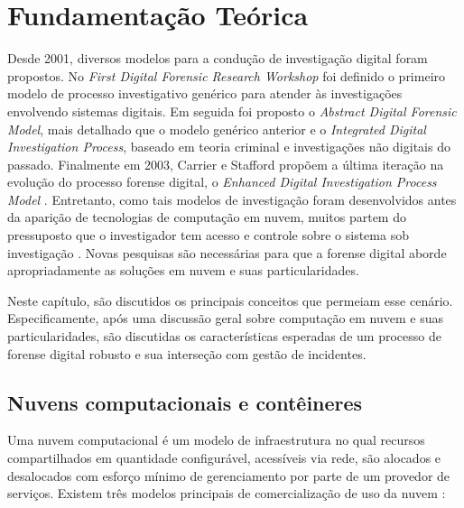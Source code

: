 \chapter{Fundamentação Teórica}
\label{chp:fundamentação}


Desde 2001, diversos modelos para a condução de investigação digital foram propostos. 
%
No \textit{First Digital Forensic Research Workshop} foi definido o primeiro modelo de processo investigativo genérico para atender às investigações envolvendo sistemas digitais.
%
Em seguida foi proposto o \textit{Abstract Digital Forensic Model}, mais detalhado que o modelo genérico anterior e o \textit{Integrated Digital Investigation Process}, baseado em teoria criminal e investigações não digitais do passado.
%
Finalmente em 2003, Carrier e Stafford propõem a última iteração na evolução do processo forense digital, o \textit{Enhanced Digital Investigation Process Model} \cite{SimouCloudChlng:2014}.
%
Entretanto, como tais modelos de investigação foram desenvolvidos antes da aparição de tecnologias de computação em nuvem, muitos partem do pressuposto que o investigador tem acesso e controle sobre o sistema sob investigação \cite{GrisposChallengesCloudComputing:2012}.
%
Novas pesquisas são necessárias para que a forense digital aborde apropriadamente as soluções em nuvem e suas particularidades.


Neste capítulo, são discutidos os principais conceitos que permeiam esse cenário.
%
Especificamente, após uma discussão geral sobre computação em nuvem e suas particularidades, são discutidas os características esperadas de um processo de forense digital robusto e sua interseção com gestão de incidentes.


\section{Nuvens computacionais e contêineres}
\label{sec:computacaonuvem}

Uma nuvem computacional é um modelo de infraestrutura no qual recursos compartilhados em quantidade configurável, acessíveis via rede, são alocados e desalocados com esforço mínimo de gerenciamento por parte de um provedor de serviços.
%
Existem três modelos principais de comercialização de uso da nuvem \cite{NIST2011}: 

